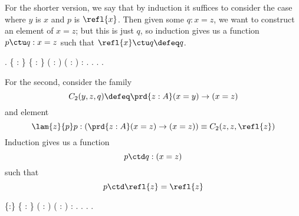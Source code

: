 For the shorter version, we say that by induction it suffices to consider the
case where $y$ is $x$ and $p$ is $\refl{x}$.  Then given some $q : x = z$, we
want to construct an element of $x=z$; but this is just $q$, so induction gives
us a function $p \ctu q : x = z$ such that $\refl{x} \ctu q \defeq q$.
\begin{coqdoccode}
\coqdocemptyline
\coqdocnoindent
{} .\coqdoceol
\coqdocemptyline
\coqdocnoindent
{}  \{ : \} \{   : \} ( :  \coqdocnotation{=} ) ( :  \coqdocnotation{=} ) :  \coqdocnotation{=} .\coqdoceol
\coqdocindent{1.00em}
 .  .\coqdoceol
\coqdocnoindent
{}.\coqdoceol
\coqdocemptyline
\end{coqdoccode}
For the second, consider the family
\[
  C_{2}(y, z, q) \defeq 
  \prd{z:A} (x=y) \to (x=z)
\]
and element
\[
  \lam{z}{p}p
  :
  \left(
    \prd{z:A} (x=z)\to (x=z)
  \right)
  \equiv
  C_{2}(z,z,\refl{z})
\]
Induction gives us a function
\[
  p \ctd q : (x = z)
\]
such that
\[
  p \ctd \refl{z} = \refl{z}
\] \begin{coqdoccode}
\coqdocnoindent
{}  \{:\} \{   : \} ( :  \coqdocnotation{=} ) ( :  \coqdocnotation{=} ) :  \coqdocnotation{=} .\coqdoceol
\coqdocindent{1.00em}
 .  .\coqdoceol
\coqdocnoindent
{}.\coqdoceol
\coqdocemptyline
\end{coqdoccode}


